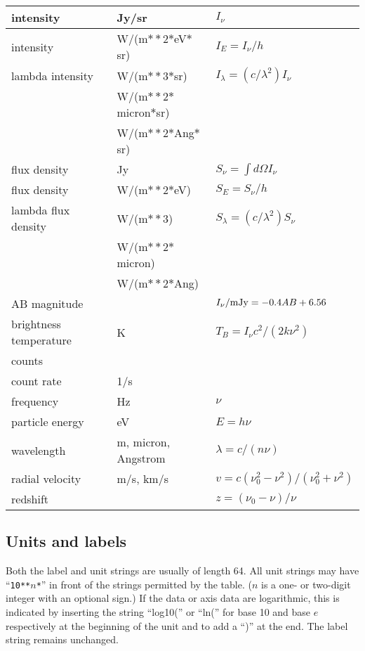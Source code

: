 \begin{center}
\begin{tabular}{|l|l|l|}
\hline \hline
intensity           &Jy/sr                &$I_{\nu}$\\
\hline
intensity           &W/(m$**$2$*$eV$*$sr) &$I_E=I_{\nu}/h$\\
\hline
lambda intensity    &W/(m$**$3$*$sr)      &$I_{\lambda}=(c/\lambda^2)I_{\nu}$\\
                    &W/(m$**$2$*$micron$*$sr) & \\
                    &W/(m$**$2$*$Ang$*$sr) & \\
\hline
flux density        &Jy                   &$S_{\nu}=\int{d\Omega I_{\nu}}$\\
\hline
flux density        &W/(m$**$2$*$eV)      &$S_E=S_{\nu}/h$\\
\hline
lambda flux density &W/(m$**$3)           &$S_{\lambda}=(c/\lambda^2)S_{\nu}$\\
                    &W/(m$**$2$*$micron)  & \\
                    &W/(m$**$2$*$Ang)     & \\
\hline
AB magnitude        &                     &$I_{\nu}/{\rm mJy}=-0.4AB+6.56$\\
\hline
brightness temperature &K                 &$T_B=I_{\nu}c^2/(2k\nu^2)$\\
\hline
counts              &                     & \\
\hline
count rate          &1/s                  & \\
\hline \hline
frequency      &Hz                  &$\nu$\\
\hline
particle energy&eV                  &$E=h\nu$\\
\hline
wavelength     &m, micron, Angstrom&$\lambda=c/(n\nu)$\\
\hline
radial velocity&m/s, km/s           &$v=c(\nu_0^2-\nu^2)/(\nu_0^2+\nu^2)$\\
\hline
redshift       &                    &$z=(\nu_0-\nu)/\nu$\\ \hline \hline
\end{tabular}
\end{center}

\subsection{Units and labels}

Both the label and unit strings are usually of length 64. All unit strings may
have ``{\tt10**$n$*}'' in front of the strings permitted by the table.
($n$ is a one- or two-digit integer with an optional sign.) If the data or axis
data are logarithmic, this is indicated by inserting the string ``log10('' or
``ln('' for base 10 and base $e$ respectively at the beginning of the unit and
to add a ``)'' at the end. The label string remains unchanged.

